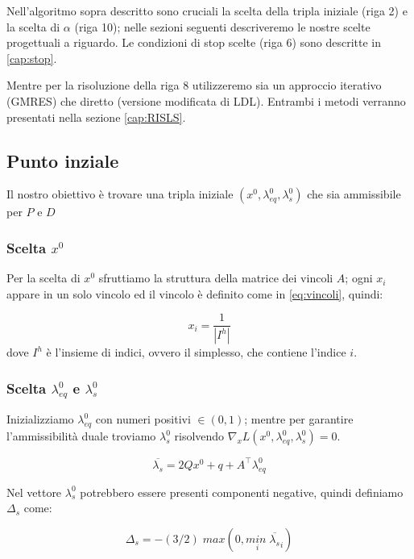 Nell'algoritmo sopra descritto sono cruciali la scelta della tripla iniziale (riga 2) e la scelta di $\alpha$ (riga 10); nelle sezioni seguenti descriveremo le nostre scelte progettuali a riguardo.
Le condizioni di stop scelte (riga 6) sono descritte in \ref{cap:stop}.

Mentre per la risoluzione della riga 8 utilizzeremo sia un approccio iterativo (GMRES) che diretto (versione modificata di LDL).
Entrambi i metodi verranno presentati nella sezione \ref{cap:RISLS}.

\subsection{Punto inziale}\label{cap:sp}
Il nostro obiettivo è trovare una tripla iniziale $(x^0, \lambda_{eq}^0, \lambda_s^0)$ che sia ammissibile per $P$ e $D$

\subsubsection*{Scelta $x^0$}
Per la scelta di $x^0$ sfruttiamo la struttura della matrice dei vincoli $A$; ogni $x_i$ appare in un solo vincolo ed il vincolo è definito come in \ref{eq:vincoli}, quindi: 

\begin{equation}\label{eq:startx}
  x_i=\frac{1}{|I^h|}  
\end{equation}
dove $I^h$ è l'insieme di indici, ovvero il simplesso, che contiene l'indice $i$.

\subsubsection*{Scelta $\lambda^0_{eq}$ e $\lambda^0_{s}$}
Inizializziamo $\lambda^0_{eq}$ con numeri positivi $\in (0,1)$; mentre per garantire l'ammissibilità duale troviamo $\lambda^0_s$ risolvendo 
$\nabla _x L(x^0, \lambda_{eq}^0, \lambda_s^0) = 0$.

\begin{equation}\label{eq:startl}
\overline{\lambda_s} = 2Qx^0+q+A^\intercal\lambda_{eq}^0
\end{equation}

Nel vettore $\lambda_s^0$ potrebbero essere presenti componenti negative, quindi definiamo $\Delta_s$ come:

\begin{equation}\label{eq:startdl}
\Delta_s = -(3/2)\;max(0, \underset{i}{min\;}\overline{\lambda_s}_i)
\end{equation}

